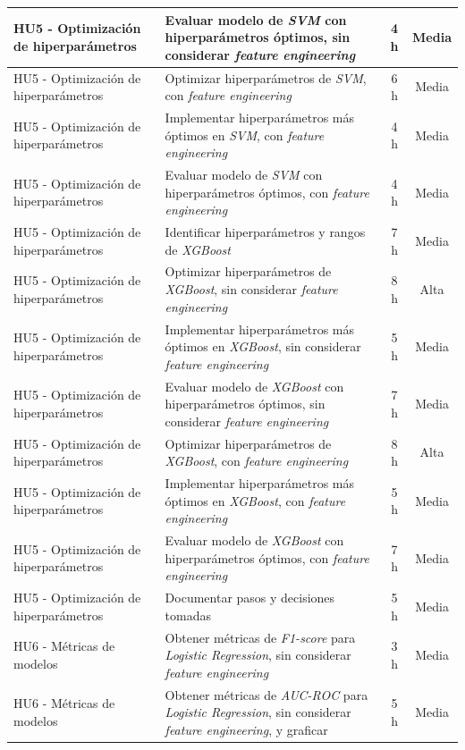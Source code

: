 \documentclass[
11pt, %
]{charter}
\begin{document}
\begin{xltabular}{\linewidth}{@{}|X|X|c|c|@{}}
HU5 - Optimización de hiperparámetros & Evaluar modelo de \textit{SVM} con hiperparámetros óptimos, sin considerar \textit{feature engineering} & 4 h & Media \\ \hline
HU5 - Optimización de hiperparámetros & Optimizar hiperparámetros de \textit{SVM}, con \textit{feature engineering} & 6 h & Media \\ \hline
HU5 - Optimización de hiperparámetros & Implementar hiperparámetros más óptimos en \textit{SVM}, con \textit{feature engineering} & 4 h & Media \\ \hline
HU5 - Optimización de hiperparámetros & Evaluar modelo de \textit{SVM} con hiperparámetros óptimos, con \textit{feature engineering} & 4 h & Media \\ \hline
HU5 - Optimización de hiperparámetros & Identificar hiperparámetros y rangos de \textit{XGBoost} & 7 h & Media \\ \hline
HU5 - Optimización de hiperparámetros & Optimizar hiperparámetros de \textit{XGBoost}, sin considerar \textit{feature engineering} & 8 h & Alta \\ \hline
HU5 - Optimización de hiperparámetros & Implementar hiperparámetros más óptimos en \textit{XGBoost}, sin considerar \textit{feature engineering} & 5 h & Media \\ \hline
HU5 - Optimización de hiperparámetros & Evaluar modelo de \textit{XGBoost} con hiperparámetros óptimos, sin considerar \textit{feature engineering} & 7 h & Media \\ \hline
HU5 - Optimización de hiperparámetros & Optimizar hiperparámetros de \textit{XGBoost}, con \textit{feature engineering} & 8 h & Alta \\ \hline
HU5 - Optimización de hiperparámetros & Implementar hiperparámetros más óptimos en \textit{XGBoost}, con \textit{feature engineering} & 5 h & Media \\ \hline
HU5 - Optimización de hiperparámetros & Evaluar modelo de \textit{XGBoost} con hiperparámetros óptimos, con \textit{feature engineering} & 7 h & Media \\ \hline
HU5 - Optimización de hiperparámetros & Documentar pasos y decisiones tomadas & 5 h & Media \\ \hline
HU6 - Métricas de modelos & Obtener métricas de \textit{F1-score} para \textit{Logistic Regression}, sin  considerar \textit{feature engineering} & 3 h & Media \\ \hline
HU6 - Métricas de modelos & Obtener métricas de \textit{AUC-ROC} para \textit{Logistic Regression}, sin  considerar \textit{feature engineering}, y graficar & 5 h & Media \\ \hline

\end{xltabular}
\end{document}
